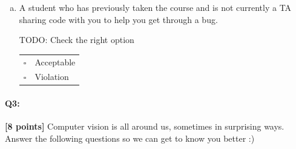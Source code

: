 \documentclass[11pt]{article}
\begin{document}
\begin{enumerate}[(a)]
\item
A student who has previously taken the course and is not currently a TA sharing code with you to help you get through a bug.

\begin{tcolorbox}[colback=white!5!white,colframe=green!75!black]
TODO: Check the right option %

\begin{tabular}[h]{ll}
$\square$ & Acceptable \\
$\square$ & Violation \\
\end{tabular}
\end{tcolorbox}

\end{enumerate}




\pagebreak

\paragraph{Q3:} \textbf{[8 points]} Computer vision is all around us, sometimes in surprising ways. Answer the following questions so we can get to know you better :)
\end{document}
